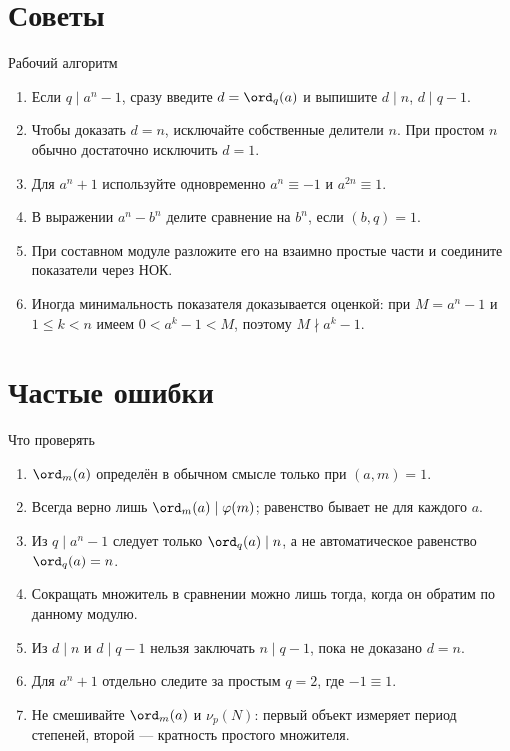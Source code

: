 \section{Советы}

\begin{methodbox}{Рабочий алгоритм}
\begin{enumerate}
  \item Если $q\mid a^n-1$, сразу введите $d=\ord_q(a)$ и выпишите
        $d\mid n$, $d\mid q-1$.
  \item Чтобы доказать $d=n$, исключайте собственные делители $n$.
        При простом $n$ обычно достаточно исключить $d=1$.
  \item Для $a^n+1$ используйте одновременно
        $a^n\equiv-1$ и $a^{2n}\equiv1$.
  \item В выражении $a^n-b^n$ делите сравнение на $b^n$, если
        $(b,q)=1$.
  \item При составном модуле разложите его на взаимно простые части и
        соедините показатели через НОК.
  \item Иногда минимальность показателя доказывается оценкой:
        при $M=a^n-1$ и $1\le k<n$ имеем
        $0<a^k-1<M$, поэтому $M\nmid a^k-1$.
\end{enumerate}
\end{methodbox}

\section{Частые ошибки}

\begin{warningbox}{Что проверять}
\begin{enumerate}
  \item $\ord_m(a)$ определён в обычном смысле только при $(a,m)=1$.
  \item Всегда верно лишь $\ord_m(a)\mid\varphi(m)$; равенство бывает
        не для каждого $a$.
  \item Из $q\mid a^n-1$ следует только $\ord_q(a)\mid n$, а не
        автоматическое равенство $\ord_q(a)=n$.
  \item Сокращать множитель в сравнении можно лишь тогда, когда он
        обратим по данному модулю.
  \item Из $d\mid n$ и $d\mid q-1$ нельзя заключать $n\mid q-1$,
        пока не доказано $d=n$.
  \item Для $a^n+1$ отдельно следите за простым $q=2$, где $-1\equiv1$.
  \item Не смешивайте $\ord_m(a)$ и $\nu_p(N)$: первый объект измеряет
        период степеней, второй --- кратность простого множителя.
\end{enumerate}
\end{warningbox}


